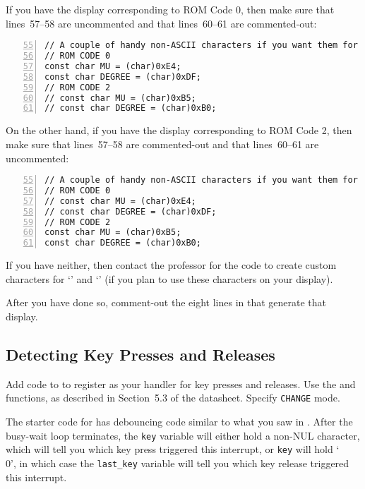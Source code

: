 If you have the display corresponding to ROM Code 0, then make sure that lines~57--58 are uncommented and that lines~60--61 are commented-out:
\begin{lstlisting}[numberstyle=\color{gray}, numbers=left, firstnumber=55]
// A couple of handy non-ASCII characters if you want them for your display
// ROM CODE 0
const char MU = (char)0xE4;
const char DEGREE = (char)0xDF;
// ROM CODE 2
// const char MU = (char)0xB5;
// const char DEGREE = (char)0xB0;
\end{lstlisting}
On the other hand, if you have the display corresponding to ROM Code 2, then make sure that lines~57--58 are commented-out and that lines~60--61 are uncommented:
\begin{lstlisting}[numberstyle=\color{gray}, numbers=left, firstnumber=55]
// A couple of handy non-ASCII characters if you want them for your display
// ROM CODE 0
// const char MU = (char)0xE4;
// const char DEGREE = (char)0xDF;
// ROM CODE 2
const char MU = (char)0xB5;
const char DEGREE = (char)0xB0;
\end{lstlisting}
If you have neither, then contact the professor for the code to create custom characters for `\textmu' and `\textdegree' (if you plan to use these characters on your display).

After you have done so, comment-out the eight lines in  that generate that display.


\subsection{Detecting Key Presses and Releases}

Add code to  to register  as your handler for key presses and releases.
Use the  and  functions, as described in Section~5.3 of the datasheet.
Specify \lstinline{CHANGE} mode.

The starter code for  has debouncing code similar to what you saw in .
After the busy-wait loop terminates, the \lstinline{key} variable will either hold a non-NUL character, which will tell you which key press triggered this interrupt,
or \lstinline{key} will hold `\\0', in which case the \lstinline{last_key} variable will tell you which key release triggered this interrupt.


